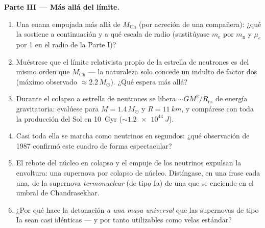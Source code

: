 \begin{problem}
\medskip\noindent\textbf{Parte III --- Más allá del límite.}
\begin{enumerate}[resume]
  \item Una enana empujada más allá de $M_{\text{Ch}}$ (por acreción de una
        compañera): ¿qué la sostiene a continuación y a qué escala
        de radio (sustitúyase $m_{\text{e}}$ por $m_{\text{n}}$ y
        $\mu_e$ por 1 en el radio de la Parte I)?
  \item Muéstrese que el límite relativista propio de la estrella de neutrones es del
        mismo orden que $M_{\text{Ch}}$ --- la naturaleza solo concede un
        indulto de factor dos (máximo observado $\approx
        2.2\,M_\odot$). ¿Qué espera más allá?
  \item Durante el colapso a estrella de neutrones se libera $\sim GM^2/R_{
        \text{ns}}$ de energía gravitatoria: evalúese
        para $M = 1.4\,M_\odot$ y $R = \qty{11}{km}$, y
        compárese con toda la producción del Sol en \qty{10}{Gyr}
        ($\sim\qty{1.2e44}{J}$).
  \item Casi toda ella se marcha como neutrinos en segundos: ¿qué
        observación de 1987 confirmó este cuadro de forma espectacular?
  \item El rebote del núcleo en colapso y el empuje de los neutrinos expulsan
        la envoltura: una supernova por colapso de núcleo. Distíngase,
        en una frase cada una, de la supernova \emph{termonuclear}
        (de tipo Ia) de una  que se enciende en el
        umbral de Chandrasekhar.
  \item ¿Por qué hace la detonación \emph{a una masa universal} que
        las supernovas de tipo Ia sean casi idénticas --- y por tanto
        utilizables como velas estándar?
\end{enumerate}


\end{problem}
